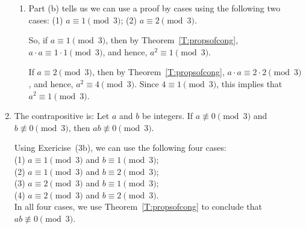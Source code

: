 \begin{enumerate}
\begin{enumerate}
\item Part (b) tells us we can use a proof by cases using the following two cases:  
(1) $a \equiv 1 \pmod 3$;  (2) $a \equiv 2 \pmod 3$.

So, if $a \equiv 1 \pmod 3$, then by Theorem~\ref{T:propsofcong}, 
$a \cdot a \equiv 1 \cdot 1 \pmod 3$, and hence, $a^2 \equiv 1 \pmod 3$.

If $a \equiv 2 \pmod 3$, then by Theorem~\ref{T:propsofcong}, 
$a \cdot a \equiv 2 \cdot 2 \pmod 3$, and hence, $a^2 \equiv 4 \pmod 3$.  Since 
$4 \equiv 1 \pmod 3$, this implies that $a^2 \equiv 1 \pmod 3$.
\end{enumerate}


%
%
%
%








\item
The contrapositive is:  Let $a$ and $b$ be integers.  If $a \not\equiv 0 \pmod3$ and 
$b \not\equiv 0 \pmod 3$, then $ab \not\equiv 0 \pmod 3$.

Using Exericise~(3b), we can use the following four cases: \\ 
(1) $a \equiv 1 \pmod 3$ and $b \equiv 1 \pmod 3$; \\
(2) $a \equiv 1 \pmod 3$ and $b \equiv 2 \pmod 3$; \\
(3) $a \equiv 2 \pmod 3$ and $b \equiv 1 \pmod 3$; \\
(4) $a \equiv 2 \pmod 3$ and $b \equiv 2 \pmod 3$. \\
In all four cases, we use Theorem~\ref{T:propsofcong} to conclude that 
$ab \not\equiv 0 \pmod 3$.



\end{enumerate}
